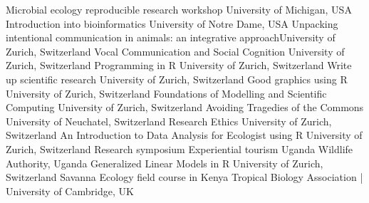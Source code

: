 

\begin{cvskills}

 {Microbial ecology reproducible research workshop} {University of Michigan, USA} 
 {Introduction into bioinformatics}  {University of Notre Dame, USA} %
 {Unpacking intentional communication in animals: an integrative approach}{University of Zurich, Switzerland}
 {Vocal Communication and Social Cognition} {University of Zurich, Switzerland}
 {Programming in R} {University of Zurich, Switzerland}
 {Write up scientific research} {University of Zurich, Switzerland}
 {Good graphics using R} {University of Zurich, Switzerland}
 {Foundations of Modelling and Scientific Computing} {University of Zurich, Switzerland}
 {Avoiding Tragedies of the Commons} {University of Neuchatel, Switzerland}
 {Research Ethics} {University of Zurich, Switzerland}
 {An Introduction to Data Analysis for Ecologist using R} {University of Zurich,
Switzerland}
 {Research symposium Experiential tourism} {Uganda Wildlife Authority, Uganda}
 {Generalized Linear Models in R} {University of Zurich, Switzerland}
 {Savanna Ecology field course in Kenya} {Tropical Biology Association | University of Cambridge, UK}


\end{cvskills}
